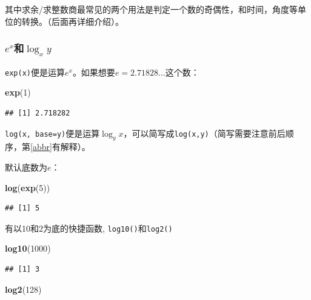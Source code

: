 \documentclass[]{book}
\newenvironment{Shaded}{\begin{snugshade}}{\end{snugshade}}
\newcommand{\DecValTok}[1]{\textcolor[rgb]{0.00,0.00,0.81}{#1}}
\newcommand{\KeywordTok}[1]{\textcolor[rgb]{0.13,0.29,0.53}{\textbf{#1}}}
\newcommand{\NormalTok}[1]{#1}
\begin{document}
其中求余/求整数商最常见的两个用法是判定一个数的奇偶性，和时间，角度等单位的转换。（后面再详细介绍）。

\hypertarget{exlog_xy}{%
\subsubsection{\texorpdfstring{\(e^x\)和\(\log_x{y}\)}{e\^{}x和\textbackslash{}log\_x\{y\}}}\label{exlog_xy}}

\texttt{exp(x)}便是运算\(e^x\)。如果想要\(e=2.71828...\)这个数：

\begin{Shaded}
\begin{Highlighting}[]
\KeywordTok{exp}\NormalTok{(}\DecValTok{1}\NormalTok{)}
\end{Highlighting}
\end{Shaded}

\begin{verbatim}
## [1] 2.718282
\end{verbatim}

\texttt{log(x,\ base=y)}便是运算\(\log_y{x}\)，可以简写成\texttt{log(x,y)}（简写需要注意前后顺序，第\ref{abbr}有解释）。

默认底数为\(e\)：

\begin{Shaded}
\begin{Highlighting}[]
\KeywordTok{log}\NormalTok{(}\KeywordTok{exp}\NormalTok{(}\DecValTok{5}\NormalTok{))}
\end{Highlighting}
\end{Shaded}

\begin{verbatim}
## [1] 5
\end{verbatim}

有以10和2为底的快捷函数, \texttt{log10()}和\texttt{log2()}

\begin{Shaded}
\begin{Highlighting}[]
\KeywordTok{log10}\NormalTok{(}\DecValTok{1000}\NormalTok{)}
\end{Highlighting}
\end{Shaded}

\begin{verbatim}
## [1] 3
\end{verbatim}

\begin{Shaded}
\begin{Highlighting}[]
\KeywordTok{log2}\NormalTok{(}\DecValTok{128}\NormalTok{)}
\end{Highlighting}
\end{Shaded}
\end{document}
